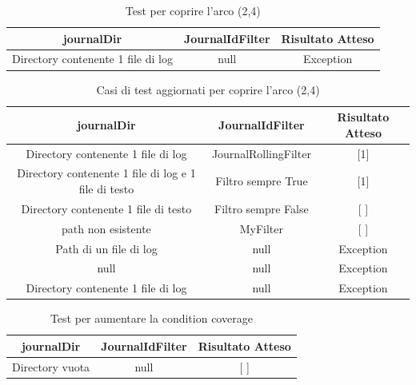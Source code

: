 \documentclass[12pt, a4paper]{article}
\begin{document}
\begin{table}[ht]
  \centering
  \caption[Journal: Test Suite - Adequacy Control Flow 1]{Test per coprire l'arco (2,4)}
  \begin{tabular}{|c|c|c|}
    \hline
journalDir & JournalIdFilter & Risultato Atteso \\
  \hline
    {Directory contenente 1 file di log} & null & Exception \\
    \hline
  \end{tabular}
  \label{tab:ACF1ListJournalIds}
\end{table}

\begin{table}[ht]
  \centering
  \caption[Journal: Test Suite - Adequacy Control Flow 2]{Casi di test aggiornati per coprire l'arco (2,4)}
  \begin{tabular}{|c|c|c|}
  \hline
  journalDir & JournalIdFilter & Risultato Atteso \\
  \hline
  {Directory contenente 1 file di log} & JournalRollingFilter & [1] \\
  {Directory contenente 1 file di log e 1 file di testo} & Filtro sempre True & [1] \\
  {Directory contenente 1 file di testo} & Filtro sempre False & [ ] \\
  {path non esistente} & MyFilter & [ ] \\
  {Path di un file di log} & null & Exception \\
  null & null & Exception \\
  {Directory contenente 1 file di log} & null & Exception \\
  \hline
  \end{tabular}
  \label{tab:ACF2ListJournalIds}
\end{table}

\begin{table}[ht]
  \centering
  \caption[Journal: Test Suite - Adequacy Control Flow 3]{Test per aumentare la condition coverage}
  \begin{tabular}{|c|c|c|}
    \hline
    journalDir & JournalIdFilter & Risultato Atteso \\
    \hline
    {Directory vuota} & null & [ ] \\
    \hline
  \end{tabular}
  \label{tab:ACF3ListJournalIds}
\end{table}
\end{document}
